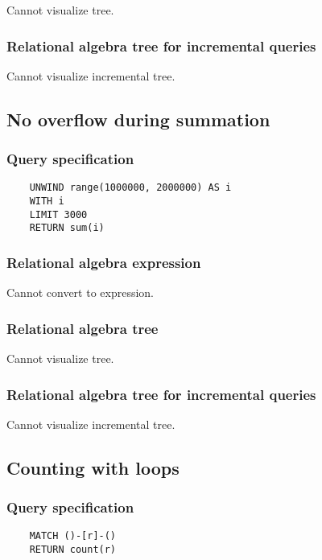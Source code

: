	Cannot visualize tree.

	\subsubsection*{Relational algebra tree for incremental queries}

	Cannot visualize incremental tree.
	\subsection{No overflow during summation}

	\subsubsection*{Query specification}

	\begin{lstlisting}
	UNWIND range(1000000, 2000000) AS i
	WITH i
	LIMIT 3000
	RETURN sum(i)
	\end{lstlisting}


	\subsubsection*{Relational algebra expression}

	Cannot convert to expression.

	\subsubsection*{Relational algebra tree}

	Cannot visualize tree.

	\subsubsection*{Relational algebra tree for incremental queries}

	Cannot visualize incremental tree.
	\subsection{Counting with loops}

	\subsubsection*{Query specification}

	\begin{lstlisting}
	MATCH ()-[r]-()
	RETURN count(r)
	\end{lstlisting}


